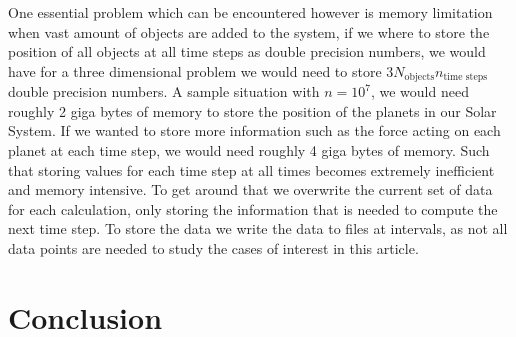 \documentclass[%
reprint,
nofootinbib,
amsmath,amssymb,
aps,
]{revtex4-1}
\begin{document}
One essential problem which can be encountered however is memory limitation when vast amount of objects are added to the system, if we where to store the position of all objects at all time steps as double precision numbers, we would have for a three dimensional problem we would need to store $3N_{\text{objects}}n_{\text{time steps}}$ double precision numbers. A sample situation with $n = 10^7$, we would need roughly 2 giga bytes of memory to store the position of the planets in our Solar System. If we wanted to store more information such as the force acting on each planet at each time step, we would need roughly 4 giga bytes of memory. Such that storing values for each time step at all times becomes extremely inefficient and memory intensive. To get around that we overwrite the current set of data for each calculation, only storing the information that is needed to compute the next time step. To store the data we write the data to files at intervals, as not all data points are needed to study the cases of interest in this article. 

 
\section{Conclusion} %



% 
\end{document}
